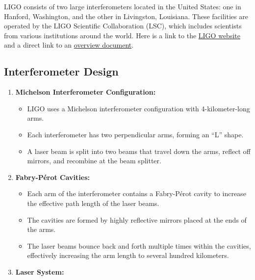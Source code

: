 \documentclass[
  a4paper,
]{book}
\providecommand{\tightlist}{%
  \setlength{\itemsep}{0pt}\setlength{\parskip}{0pt}}
\begin{document}
\begin{tcolorbox}[enhanced jigsaw, coltitle=black, title=\textcolor{quarto-callout-note-color}{\faInfo}\hspace{0.5em}{LIGO Technical Details}, colframe=quarto-callout-note-color-frame, toprule=.15mm, opacitybacktitle=0.6, left=2mm, opacityback=0, breakable, toptitle=1mm, bottomtitle=1mm, leftrule=.75mm, arc=.35mm, titlerule=0mm, colbacktitle=quarto-callout-note-color!10!white, rightrule=.15mm, bottomrule=.15mm, colback=white]

LIGO consists of two large interferometers located in the United States:
one in Hanford, Washington, and the other in Livingston, Louisiana.
These facilities are operated by the LIGO Scientific Collaboration
(LSC), which includes scientists from various institutions around the
world. Here is a link to the \href{https://www.ligo.caltech.edu/}{LIGO
website} and a direct link to an
\href{https://www.ligo.caltech.edu/system/media_files/binaries/303/original/ligo-educators-guide.pdf?1455165573}{overview
document}.

\subsection{Interferometer Design}\label{interferometer-design}

\begin{enumerate}
\def\labelenumi{\arabic{enumi}.}
\tightlist
\item
  \textbf{Michelson Interferometer Configuration:}

  \begin{itemize}
  \tightlist
  \item
    LIGO uses a Michelson interferometer configuration with
    4-kilometer-long arms.
  \item
    Each interferometer has two perpendicular arms, forming an ``L''
    shape.
  \item
    A laser beam is split into two beams that travel down the arms,
    reflect off mirrors, and recombine at the beam splitter.
  \end{itemize}
\item
  \textbf{Fabry-Pérot Cavities:}

  \begin{itemize}
  \tightlist
  \item
    Each arm of the interferometer contains a Fabry-Pérot cavity to
    increase the effective path length of the laser beams.
  \item
    The cavities are formed by highly reflective mirrors placed at the
    ends of the arms.
  \item
    The laser beams bounce back and forth multiple times within the
    cavities, effectively increasing the arm length to several hundred
    kilometers.
  \end{itemize}
\item
  \textbf{Laser System:}


\end{enumerate}
\end{tcolorbox}
\end{document}
